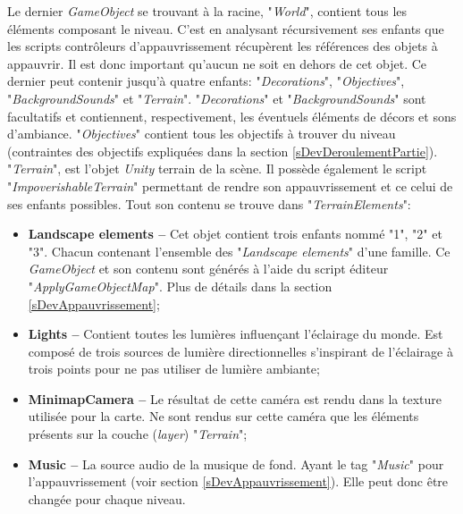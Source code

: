 		Le dernier \textit{GameObject} se trouvant à la racine, "\textit{World}", contient tous les éléments composant le niveau. C'est en analysant récursivement ses enfants que les scripts contrôleurs d'appauvrissement récupèrent les références des objets à appauvrir. Il est donc important qu'aucun ne soit en dehors de cet objet. Ce dernier peut contenir jusqu'à quatre enfants: "\textit{Decorations}", "\textit{Objectives}", "\textit{BackgroundSounds}" et "\textit{Terrain}". "\textit{Decorations}" et "\textit{BackgroundSounds}" sont facultatifs et contiennent, respectivement, les éventuels éléments de décors et sons d'ambiance.  "\textit{Objectives}" contient tous les objectifs à trouver du niveau (contraintes des objectifs expliquées dans la section \ref{sDevDeroulementPartie}). "\textit{Terrain}", est l'objet \textit{Unity} terrain de la scène. Il possède également le script "\textit{ImpoverishableTerrain}" permettant de rendre son appauvrissement et ce celui de ses enfants possibles. Tout son contenu se trouve dans "\textit{TerrainElements}":%
		\begin{itemize}
			\item \textbf{Landscape elements --} Cet objet contient trois enfants nommé "1", "2" et "3". Chacun contenant l'ensemble des "\textit{Landscape elements}" d'une famille. Ce \textit{GameObject} et son contenu sont générés à l'aide du script éditeur "\textit{ApplyGameObjectMap}". Plus de détails dans la section \ref{sDevAppauvrissement};%
			
			\item \textbf{Lights --} Contient toutes les lumières influençant l'éclairage du monde. Est composé de trois sources de lumière directionnelles s'inspirant de l'éclairage à trois points \cite{3PointsLightning} pour ne pas utiliser de lumière ambiante;
			
			\item \textbf{MinimapCamera --} Le résultat de cette caméra est rendu dans la texture utilisée pour la carte. Ne sont rendus sur cette caméra que les éléments présents sur la couche (\textit{layer}) "\textit{Terrain}";%
			
			\item \textbf{Music --} La source audio de la musique de fond. Ayant le tag "\textit{Music}" pour l'appauvrissement (voir section \ref{sDevAppauvrissement}). Elle peut donc être changée pour chaque niveau.
		\end{itemize}

